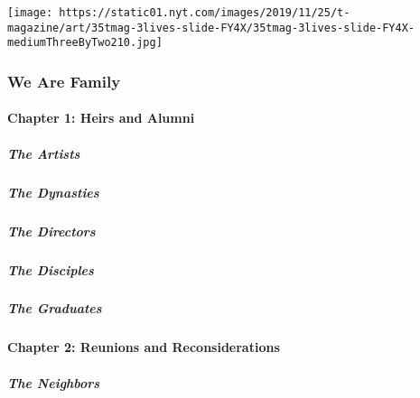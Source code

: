 \texttt{[image: https://static01.nyt.com/images/2019/11/25/t-magazine/art/35tmag-3lives-slide-FY4X/35tmag-3lives-slide-FY4X-mediumThreeByTwo210.jpg]}

\hypertarget{we-are-family-1}{%
\subsubsection{We Are Family}\label{we-are-family-1}}

\hypertarget{chapter-1-heirs-and-alumni}{%
\paragraph{Chapter 1: Heirs and
Alumni}\label{chapter-1-heirs-and-alumni}}

\href{/interactive/2020/04/13/t-magazine/black-art-galleries.html}{}

\hypertarget{the-artists}{%
\subparagraph{The Artists}\label{the-artists}}

\href{/interactive/2020/04/13/t-magazine/italian-fashion-design-houses.html}{}

\hypertarget{the-dynasties}{%
\subparagraph{The Dynasties}\label{the-dynasties}}

\href{/interactive/2020/04/13/t-magazine/gordon-parks.html}{}

\hypertarget{the-directors}{%
\subparagraph{The Directors}\label{the-directors}}

\href{/interactive/2020/04/13/t-magazine/enrique-olvera-chef.html}{}

\hypertarget{the-disciples}{%
\subparagraph{The Disciples}\label{the-disciples}}

\href{/interactive/2020/04/13/t-magazine/royal-academy-antwerp.html}{}

\hypertarget{the-graduates}{%
\subparagraph{The Graduates}\label{the-graduates}}

\hypertarget{chapter-2-reunions-and-reconsiderations-1}{%
\paragraph{Chapter 2: Reunions and
Reconsiderations}\label{chapter-2-reunions-and-reconsiderations-1}}

\href{/interactive/2020/04/13/t-magazine/ninth-street-greenwich-village-neighbors.html}{}

\hypertarget{the-neighbors}{%
\subparagraph{The Neighbors}\label{the-neighbors}}

\href{/interactive/2020/04/13/t-magazine/omen-restaurant-nyc.html}{}

